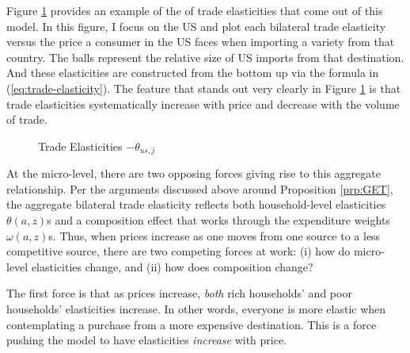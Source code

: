 \documentclass[12pt,pdftex]{article}
\begin{document}
\begin{onehalfspacing}
Figure \ref{fig:bilateral-elasticities} provides an example of the of trade elasticities that come out of this model. In this figure, I focus on the US and plot each bilateral trade elasticity versus the price a consumer in the US faces when importing a variety from that country. The balls represent the relative size of US imports from that destination. And these elasticities are constructed from the bottom up via the formula in (\ref{eq:trade-elasticity}). The feature that stands out very clearly in Figure \ref{fig:bilateral-elasticities} is that trade elasticities systematically increase with price and decrease with the volume of trade.

\begin{figure}[!t]
\caption{Trade Elasticities $-\theta_{us,j}$}\label{fig:bilateral-elasticities}
\end{figure}

At the micro-level, there are two opposing forces giving rise to this aggregate relationship. Per the arguments discussed above around Proposition \ref{prp:GET}, the aggregate bilateral trade elasticity reflects both household-level elasticities $\theta(a,z)$s and a composition effect that works through the expenditure weights $\omega(a,z)$s. Thus, when prices increase as one moves from one source to a less competitive source, there are two competing forces at work: (i) how do micro-level elasticities change, and (ii) how does composition change?

The first force is that as prices increase, \emph{both} rich households' and poor households' elasticities increase. In other words, everyone is more elastic when contemplating a purchase from a more expensive destination. This is a force pushing the model to have elasticities \emph{increase} with price.


\end{onehalfspacing}
\end{document}
